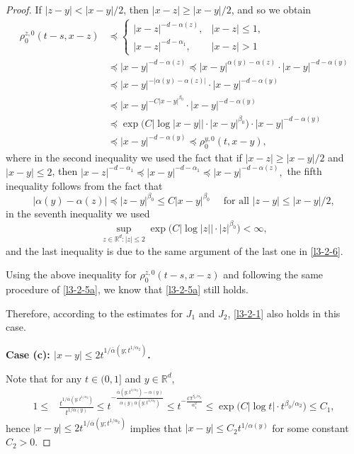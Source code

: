 \documentclass[a4paper,11pt]{amsart}
\renewcommand{\le}{\leqslant}
\renewcommand{\ge}{\geqslant}
\newcommand{\R}{\mathds R}
\newcommand{\B}{\beta}
\newcommand{\p}{\preceq}
\newcommand{\A}{\alpha}
\theoremstyle{definition}
\begin{document}
\begin{proof}
If $|z-y|<{|x-y|}/{2}$, then $|x-z|\ge {|x-y|}/{2}$,
and so we obtain
\begin{equation}\label{l3-2-7}
\begin{split}
\rho_0^{z,0}(t-s,x-z)&\p
\begin{cases}
|x-z|^{-d-\A(z)},& |x-z|\le 1,\\
|x-z|^{-d-\A_1}, & |x-z|>1
\end{cases}
\\
&\p |x-y|^{-d-\A(z)} \p |x-y|^{\A(y)-\A(z)}\cdot|x-y|^{-d-\A(y)}\\
&\p |x-y|^{-|\A(y)-\A(z)|}\cdot|x-y|^{-d-\A(y)}\\
&\p |x-y|^{-C|x-y|^{\beta_0}}\cdot|x-y|^{-d-\A(y)}\\
&\p \exp\big(C|\log|x-y||\cdot|x-y|^{\B_0}\big)\cdot|x-y|^{-d-\A(y)}\\
&\p |x-y|^{-d-\A(y)}\p \rho_0^{y,0}(t,x-y),
\end{split}
\end{equation}
where in the second inequality we used the fact that if $|x-z|\ge {|x-y|}/{2}$ and $|x-y|\le 2$, then
$|x-z|^{-d-\A_1}\p |x-y|^{-d-\A_1}\p |x-y|^{-d-\A(z)},$
the fifth inequality follows from the fact that
$$|\A(y)-\A(z)|\p |z-y|^{\beta_0}\le C |x-y|^{\B_0}\quad\textrm{ for all }|z-y|\le {|x-y|}/{2},$$
in the seventh inequality we used $$\sup_{z\in \R^d: |z|\le 2}\exp\big(C|\log
|z||\cdot|z|^{\beta_0}\big)<\infty,$$ and the last inequality is due to
the same argument of the last one in \eqref{l3-2-6}.


Using the above inequality for $\rho_0^{z,0}(t-s,x-z)$ and following the same procedure of \eqref{l3-2-5a},
we know that \eqref{l3-2-5a} still holds.

Therefore, according to the estimates for $J_1$ and $J_2$, \eqref{l3-2-1} also holds in this case.



{\bf Case (c): $|x-y|\le
2t^{{1}/{\overline{\A}(y;t^{{1/\A_2}})}}$.}


Note that for any $t \in (0,1]$ and $y \in \R^d$,
\begin{equation}\label{l3-2-8}
\begin{split}
1\le&
\frac{t^{{1}/{\overline{\A}(y;t^{{1/\A_2}})}}}{t^{{1/\A(y)}}}\le
t^{-\frac{\overline{\A}(y;t^{{1/\A_2}})-\A(y)}{\A(y)\overline{\A}(y;t^{{1/\A_2}})}}
\le
t^{-\frac{Ct^{{\B_0}/{\A_2}}}{\A_1^2}}\le \exp\big(C|\log
t|\cdot t^{{\B_0}/{\A_2}} \big)\le C_1 ,
\end{split}
\end{equation}
hence $|x-y|\le 2t^{{1}/{\overline{\A}(y;t^{{1/\A_2}})}}$
implies that $|x-y|\le C_2 t^{{1/\A(y)}}$ for some constant
$C_2>0$.


\end{proof}
\end{document}
